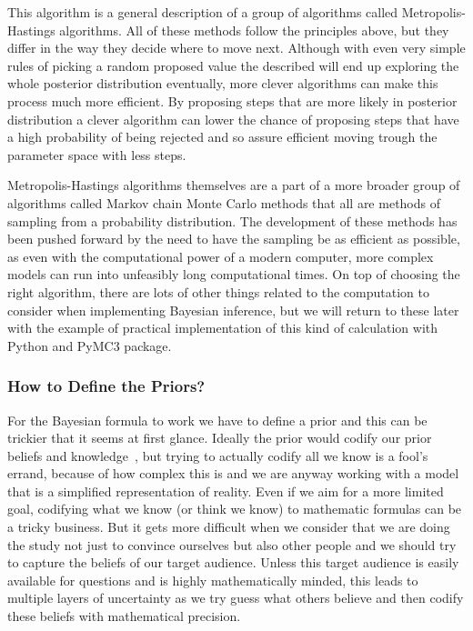 \documentclass[12pt,a4paper,leqno]{report}
\theoremstyle{plain}
\theoremstyle{definition}
\theoremstyle{remark}
\begin{document}
This algorithm is a general description of a group of algorithms called
Metropolis-Hastings algorithms. All of these methods follow the principles
above, but they differ in the way they decide where to move next. Although with
even very simple rules of picking a random proposed value the described will end
up exploring the whole posterior distribution eventually, more clever algorithms
can make this process much more efficient. By proposing steps that are more
likely in posterior distribution a clever algorithm can lower the chance of
proposing steps that have a high probability of being rejected and so assure
efficient moving trough the parameter space with less steps.

Metropolis-Hastings algorithms themselves are a part of a more broader group of
algorithms called Markov chain Monte Carlo methods that all are methods of
sampling from a probability distribution. The development of these methods has
been pushed forward by the need to have the sampling be as efficient as
possible, as even with the computational power of a modern computer, more complex
models can run into unfeasibly long computational times. On top of choosing the
right algorithm, there are lots of other things related to the computation to
consider when implementing Bayesian inference, but we will return to these later
with the example of practical implementation of this kind of calculation with
Python and PyMC3 package.

\subsubsection{How to Define the Priors?}\label{bayesproblems}

For the Bayesian formula to work we have to define a prior and this can be
trickier that it seems at first glance. Ideally the prior would codify our prior
beliefs and knowledge\ \cite{gelman, kruschke}, but trying to actually codify all we
know is a fool's errand, because of how complex this is and we are
anyway working with a model that is a simplified representation of reality. Even if
we aim for a more limited goal, codifying what we know (or think we know)
to mathematic formulas can be a tricky business. But it gets more
difficult when we consider that we are doing the study not just to convince ourselves
but also other people and we should try to capture the beliefs of our target audience.
Unless this target audience is easily available for questions and is highly mathematically minded,
this leads to multiple layers of uncertainty as we try guess what others
believe and then codify these beliefs with mathematical precision.
\end{document}

